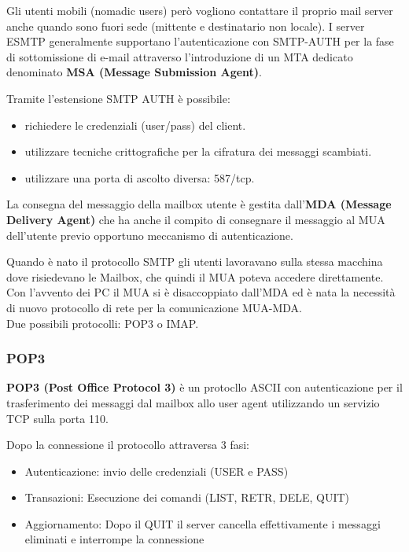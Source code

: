             Gli utenti mobili (nomadic users) però vogliono contattare il proprio mail server anche quando sono fuori sede (mittente e destinatario non locale). I server ESMTP generalmente supportano l'autenticazione con SMTP-AUTH per la fase di sottomissione di e-mail attraverso l'introduzione di un MTA dedicato denominato \textbf{MSA (Message Submission Agent)}.

            Tramite l'estensione SMTP AUTH è possibile:
            \begin{itemize}
                \item richiedere le credenziali (user/pass) del client.
                \item utilizzare tecniche crittografiche per la cifratura dei messaggi scambiati.
                \item utilizzare una porta di ascolto diversa: 587/tcp.
            \end{itemize}

            La consegna del messaggio della mailbox utente è gestita dall'\textbf{MDA (Message Delivery Agent)} che ha anche il compito di consegnare il messaggio al MUA dell'utente previo opportuno meccanismo di autenticazione.

            Quando è nato il protocollo SMTP gli utenti lavoravano sulla stessa macchina dove risiedevano le Mailbox, che quindi il MUA poteva accedere direttamente. Con l'avvento dei PC il MUA si è disaccoppiato dall’MDA ed è nata la necessità di nuovo protocollo di rete per la comunicazione MUA-MDA.\\
            Due possibili protocolli: POP3 o IMAP.

        \subsubsection{POP3}
            \textbf{POP3 (Post Office Protocol 3)} è un protocllo ASCII con autenticazione per il trasferimento dei messaggi dal mailbox allo user agent utilizzando un servizio TCP sulla porta 110.
        
            Dopo la connessione il protocollo attraversa 3 fasi:
            \begin{itemize}
                \item Autenticazione: invio delle credenziali (USER e PASS)
                \item Transazioni: Esecuzione dei comandi (LIST, RETR, DELE, QUIT)
                \item Aggiornamento: Dopo il QUIT il server cancella effettivamente i messaggi eliminati e interrompe la connessione                
            \end{itemize}

